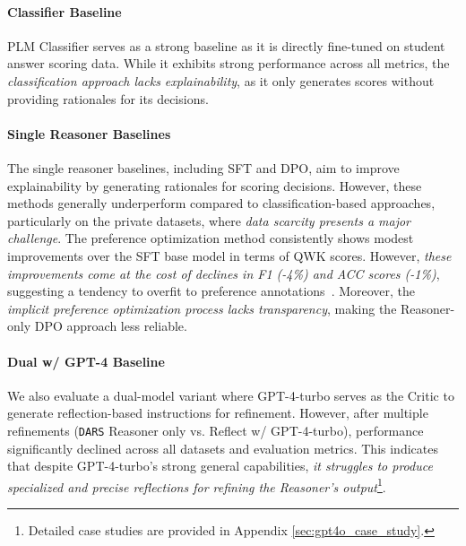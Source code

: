 \paragraph{Classifier Baseline} PLM Classifier serves as a strong baseline as it is directly fine-tuned on student answer scoring data. While it exhibits strong performance across all metrics, the \emph{classification approach lacks explainability}, as it only generates scores without providing rationales for its decisions.


\paragraph{Single Reasoner Baselines} The single reasoner baselines, including SFT and DPO, aim to improve explainability by generating rationales for scoring decisions. However, these methods generally underperform compared to classification-based approaches, particularly on the private datasets, where \emph{data scarcity presents a major challenge}. The preference optimization method consistently shows modest improvements over the SFT base model in terms of QWK scores. However, \emph{these improvements come at the cost of declines in F1 (-4\%) and ACC scores (-1\%)}, suggesting a tendency to overfit to preference annotations~\cite{chowdhury2024provably,mitchell2023note}. Moreover, the \emph{implicit preference optimization process lacks transparency}, making the Reasoner-only DPO approach less reliable.

\paragraph{Dual w/ GPT-4 Baseline} We also evaluate a dual-model variant where GPT-4-turbo serves as the Critic to generate reflection-based instructions for refinement. However, after multiple refinements (\texttt{DARS} Reasoner only vs. Reflect w/ GPT-4-turbo), performance significantly declined across all datasets and evaluation metrics. This indicates that despite GPT-4-turbo’s strong general capabilities, \emph{it struggles to produce specialized and precise reflections for refining the Reasoner's output}\footnote{Detailed case studies are provided in Appendix \ref{sec:gpt4o_case_study}.}.


